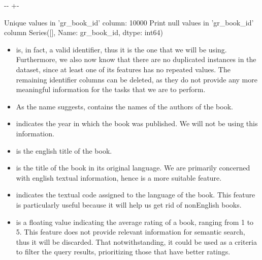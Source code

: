 \documentclass[letterpaper,10pt,english]{sphinxmanual}
\newlength\nbsphinxcodecellspacing
\begin{document}
{

\kern-\sphinxverbatimsmallskipamount\kern-\baselineskip
\kern+\FrameHeightAdjust\kern-\fboxrule
\vspace{\nbsphinxcodecellspacing}

\begin{sphinxVerbatim}[commandchars=\\\{\}]
Unique values in 'gr\_book\_id' column: 10000
Print null values in 'gr\_book\_id' column Series([], Name: gr\_book\_id, dtype: int64)
\end{sphinxVerbatim}
}
\begin{itemize}
\item {} 
 is, in fact, a valid identifier, thus it is the one that we will be using. Furthermore, we also now know that there are no duplicated instances in the dataset, since at least one of its features has no repeated values. The remaining identifier columns can be deleted, as they do not provide any more meaningful information for the tasks that we are to perform.

\item {} 
As the name suggests,  contains the names of the authors of the book.

\item {} 
 indicates the year in which the book was published. We will not be using this information.

\item {} 
 is the english title of the book.

\item {} 
 is the title of the book in its original language. We are primarily concerned with english textual information, hence  is a more suitable feature.

\item {} 
 indicates the textual code assigned to the language of the book. This feature is particularly useful because it will help us get rid of non\sphinxhyphen{}English books.

\item {} 
 is a floating value indicating the average rating of a book, ranging from 1 to 5. This feature does not provide relevant information for semantic search, thus it will be discarded. That notwithstanding, it could be used as a criteria to filter the query results, prioritizing those that have better ratings.


\end{itemize}
\end{document}
